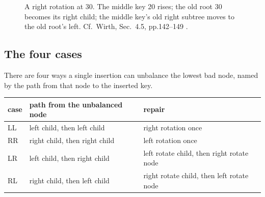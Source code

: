 \documentclass[11pt]{article}
\theoremstyle{definition}
\begin{document}
\begin{figure}[h]
  \centering
  \caption{A right rotation at 30. The middle key 20 rises; the old root 30
    becomes its right child; the middle key's old right subtree moves to the
    old root's left. Cf.\ Wirth, Sec.~4.5, pp.142--149
    \cite{Wirth2004_algorithms_data_structures}.}
  \label{fig:rot}
\end{figure}

\subsection{The four cases}

There are four ways a single insertion can unbalance the lowest bad node,
named by the path from that node to the inserted key.

\begin{center}
{\footnotesize
\begin{tabular}{l l l}
  \toprule
  \textbf{case} & \textbf{path from the unbalanced node} & \textbf{repair} \\
  \midrule
  LL & left child, then left child  & right rotation once \\
  RR & right child, then right child & left rotation once \\
  LR & left child, then right child & left rotate child, then right rotate node \\
  RL & right child, then left child & right rotate child, then left rotate node \\
  \bottomrule
\end{tabular}}
\end{center}
\end{document}
